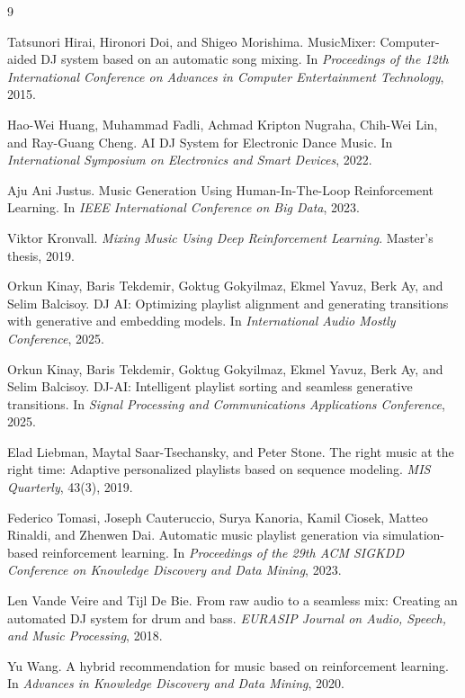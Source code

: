 \documentclass{article}
\begin{document}
\begin{thebibliography}{9}

Tatsunori Hirai, Hironori Doi, and Shigeo Morishima.
\newblock MusicMixer: Computer-aided DJ system based on an automatic song mixing.
\newblock In \emph{Proceedings of the 12th International Conference on Advances in Computer Entertainment Technology}, 2015.

Hao-Wei Huang, Muhammad Fadli, Achmad Kripton Nugraha, Chih-Wei Lin, and Ray-Guang Cheng.
\newblock AI DJ System for Electronic Dance Music.
\newblock In \emph{International Symposium on Electronics and Smart Devices}, 2022.

Aju Ani Justus.
\newblock Music Generation Using Human-In-The-Loop Reinforcement Learning.
\newblock In \emph{IEEE International Conference on Big Data}, 2023.

Viktor Kronvall.
\newblock \emph{Mixing Music Using Deep Reinforcement Learning}.
\newblock Master's thesis, 2019.

Orkun Kinay, Baris Tekdemir, Goktug Gokyilmaz, Ekmel Yavuz, Berk Ay, and Selim Balcisoy.
\newblock DJ AI: Optimizing playlist alignment and generating transitions with generative and embedding models.
\newblock In \emph{International Audio Mostly Conference}, 2025.

Orkun Kinay, Baris Tekdemir, Goktug Gokyilmaz, Ekmel Yavuz, Berk Ay, and Selim Balcisoy.
\newblock DJ-AI: Intelligent playlist sorting and seamless generative transitions.
\newblock In \emph{Signal Processing and Communications Applications Conference}, 2025.

Elad Liebman, Maytal Saar-Tsechansky, and Peter Stone.
\newblock The right music at the right time: Adaptive personalized playlists based on sequence modeling.
\newblock \emph{MIS Quarterly}, 43(3), 2019.

Federico Tomasi, Joseph Cauteruccio, Surya Kanoria, Kamil Ciosek, Matteo Rinaldi, and Zhenwen Dai.
\newblock Automatic music playlist generation via simulation-based reinforcement learning.
\newblock In \emph{Proceedings of the 29th ACM SIGKDD Conference on Knowledge Discovery and Data Mining}, 2023.

Len Vande Veire and Tijl De Bie.
\newblock From raw audio to a seamless mix: Creating an automated DJ system for drum and bass.
\newblock \emph{EURASIP Journal on Audio, Speech, and Music Processing}, 2018.

Yu Wang.
\newblock A hybrid recommendation for music based on reinforcement learning.
\newblock In \emph{Advances in Knowledge Discovery and Data Mining}, 2020.

\end{thebibliography}
\end{document}
